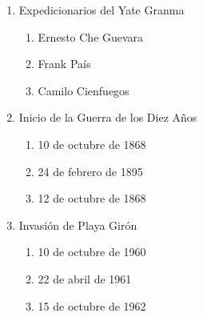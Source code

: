 \documentclass[twocolumn]{article}
\begin{document}
\begin{enumerate}



  \item Expedicionarios del Yate Granma

  \begin{enumerate}
   
   \item Ernesto Che Guevara
   
   \item Frank País
   
   \item Camilo Cienfuegos
   
  \end{enumerate}



  \item Inicio de la Guerra de los Diez Años

  \begin{enumerate}
   
   \item 10 de octubre de 1868
   
   \item 24 de febrero de 1895
   
   \item 12 de octubre de 1868
   
  \end{enumerate}



  \item Invasión de Playa Girón

  \begin{enumerate}
   
   \item 10 de octubre de 1960
   
   \item 22 de abril de 1961
   
   \item 15 de octubre de 1962
   
  \end{enumerate}




\end{enumerate}
\end{document}
